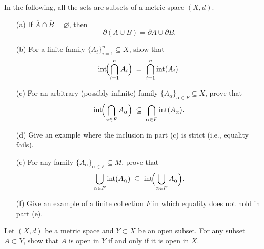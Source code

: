 \begin{problem}
    In the following, all the sets are subsets of a metric space $(X,d)$.

 \begin{enumerate}
  \item[(a)] If $\overline{A}\cap\overline{B}=\varnothing$, then 
  \[
  \partial(A\cup B) = \partial A \cup \partial B.
  \]

  \item[(b)] For a finite family $\{A_i\}_{i=1}^n\subseteq X$, show that
  \[
  \operatorname{int}\!\Bigl(\bigcap_{i=1}^n A_i\Bigr)
  \;=\;
  \bigcap_{i=1}^n \operatorname{int}(A_i).
  \]

  \item[(c)] For an arbitrary (possibly infinite) family $\{A_\alpha\}_{\alpha\in F}\subseteq X$, prove that
  \[
  \operatorname{int}\!\Bigl(\bigcap_{\alpha\in F} A_\alpha\Bigr)
  \;\subseteq\;
  \bigcap_{\alpha\in F}\operatorname{int}(A_\alpha).
  \]

  \item[(d)] Give an example where the inclusion in part \textup{(c)} is strict (i.e., equality fails).

  \item[(e)] For any family $\{A_\alpha\}_{\alpha\in F}\subseteq M$, prove that
  \[
  \bigcup_{\alpha\in F}\operatorname{int}(A_\alpha)
  \;\subseteq\;
  \operatorname{int}\!\Bigl(\bigcup_{\alpha\in F} A_\alpha\Bigr).
  \]

  \item[(f)] Give an example of a finite collection $F$ in which equality does not hold in part \textup{(e)}.
\end{enumerate}

\end{problem}

\begin{problem}
    Let $(X, d)$ be a metric space and $Y \subset X$ be an open subset. For any subset $A \subset Y$, show
that $A$ is open in $Y$ if and only if it is open in $X$.
\end{problem}

